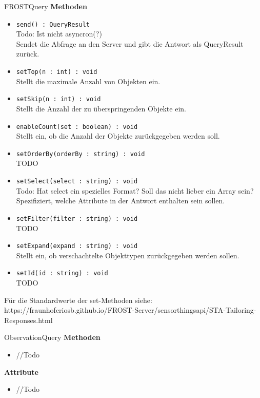 \begin{Class}{FROSTQuery}
    \textbf{Methoden}
    \begin{itemize}
        \item \texttt{send() : QueryResult}
        \\ Todo: Ist nicht asyncron(?)
        \\Sendet die Abfrage an den Server und gibt die Antwort als QueryResult zurück.
        \item \texttt{setTop(n : int) : void}
        \\Stellt die maximale Anzahl von Objekten ein.
        \item \texttt{setSkip(n : int) : void}
        \\Stellt die Anzahl der zu überspringenden Objekte ein.
        \item \texttt{enableCount(set : boolean) : void}
        \\Stellt ein, ob die Anzahl der Objekte zurückgegeben werden soll.
        \item \texttt{setOrderBy(orderBy : string) : void}
        \\TODO
        \item \texttt{setSelect(select : string) : void}
	\\Todo: Hat select ein spezielles Format? Soll das nicht lieber ein Array sein?
        \\Spezifiziert, welche Attribute in der Antwort enthalten sein sollen.
        \item \texttt{setFilter(filter : string) : void}
        \\TODO
        \item \texttt{setExpand(expand : string) : void}
        \\Stellt ein, ob verschachtelte Objekttypen zurückgegeben werden sollen.
        \item \texttt{setId(id : string) : void}
        \\TODO
    \end{itemize}
    Für die Standardwerte der set-Methoden siehe:
    \\https://fraunhoferiosb.github.io/FROST-Server/sensorthingsapi/STA-Tailoring-Responses.html
\end{Class}

\begin{Class}{ObservationQuery}
    \textbf{Methoden}
    \begin{itemize}
        \item //Todo
    \end{itemize}
    
    \textbf{Attribute}
    \begin{itemize}
        \item //Todo
    \end{itemize}
\end{Class}

